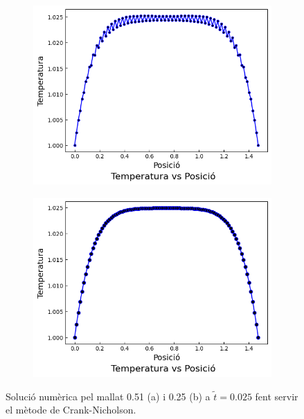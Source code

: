 \documentclass{article}
\begin{document}
\begin{figure}[h]
    \centering
    \begin{subfigure}[b]{0.35\textwidth}
        \includegraphics[width=\textwidth]{images/T_vs_z_at1.png} 
        \caption{}
        \label{fig:CN_at1}
    \end{subfigure}
    \hspace{1.5cm}
    \begin{subfigure}[b]{0.35\textwidth}
        \includegraphics[width=\textwidth]{images/T_vs_z_at2.png}
        \caption{} 
        \label{fig:CN_at2}
    \end{subfigure}
    \caption{Solució numèrica pel mallat 0.51 (a) i 0.25 (b) a $\tilde{t}=0.025$ fent servir el mètode de Crank-Nicholson.}
    \label{fig:crank_nicholson}
\end{figure}
\end{document}
